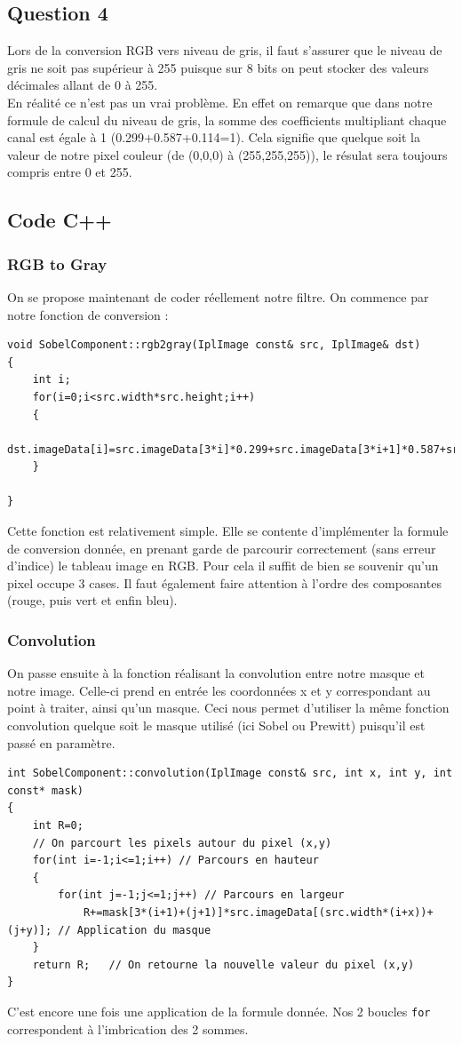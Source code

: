 \subsection{Question 4}
Lors de la conversion RGB vers niveau de gris, il faut s'assurer que le niveau de gris ne soit pas supérieur à 255 puisque sur 8 bits on peut stocker des valeurs décimales allant de 0 à 255.\\
En réalité ce n'est pas un vrai problème. En effet on remarque que dans notre formule de calcul du niveau de gris, la somme des coefficients multipliant chaque canal est égale à 1 (0.299+0.587+0.114=1). Cela signifie que quelque soit la valeur de notre pixel couleur (de (0,0,0) à (255,255,255)), le résulat sera toujours compris entre 0 et 255.

\subsection{Code C++}
\subsubsection{RGB to Gray}
On se propose maintenant de coder réellement notre filtre. On commence par notre fonction de conversion :
\cpp
\begin{lstlisting}
void SobelComponent::rgb2gray(IplImage const& src, IplImage& dst)
{
	int i;
	for(i=0;i<src.width*src.height;i++)
	{
		dst.imageData[i]=src.imageData[3*i]*0.299+src.imageData[3*i+1]*0.587+src.imageData[3*i+2]*0.114;
	}
	
}
\end{lstlisting}
Cette fonction est relativement simple. Elle se contente d'implémenter la formule de conversion donnée, en prenant garde de parcourir correctement (sans erreur d'indice) le tableau image en RGB. Pour cela il suffit de bien se souvenir qu'un pixel occupe 3 cases. Il faut également faire attention à l'ordre des composantes (rouge, puis vert et enfin bleu).

\subsubsection{Convolution}
On passe ensuite à la fonction réalisant la convolution entre notre masque et notre image. Celle-ci prend en entrée les coordonnées x et y correspondant au point à traiter, ainsi qu'un masque. Ceci nous permet d'utiliser la même fonction convolution quelque soit le masque utilisé (ici Sobel ou Prewitt) puisqu'il est passé en paramètre.
\cpp
\begin{lstlisting}
int SobelComponent::convolution(IplImage const& src, int x, int y, int const* mask)
{ 
	int R=0;
	// On parcourt les pixels autour du pixel (x,y)
	for(int i=-1;i<=1;i++) // Parcours en hauteur
	{
		for(int j=-1;j<=1;j++) // Parcours en largeur
			R+=mask[3*(i+1)+(j+1)]*src.imageData[(src.width*(i+x))+(j+y)]; // Application du masque
	}
	return R;	// On retourne la nouvelle valeur du pixel (x,y)
}
\end{lstlisting}
C'est encore une fois une application de la formule donnée. Nos 2 boucles \lstinline{for} correspondent à l'imbrication des 2 sommes.

